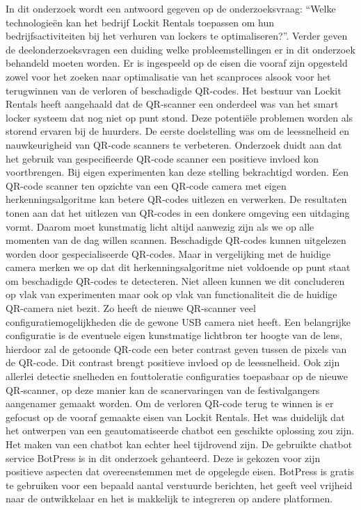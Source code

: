 In dit onderzoek wordt een antwoord gegeven op de onderzoeksvraag: “Welke technologieën kan het bedrijf Lockit Rentals toepassen om hun bedrijfsactiviteiten bij het verhuren van lockers te optimaliseren?”. Verder geven de deelonderzoeksvragen een duiding welke probleemstellingen er in dit onderzoek behandeld moeten worden. Er is ingespeeld op de eisen die vooraf zijn opgesteld zowel voor het zoeken naar optimalisatie van het scanproces alsook voor het terugwinnen van de verloren of beschadigde QR-codes. \newline
Het bestuur van Lockit Rentals heeft aangehaald dat de QR-scanner een onderdeel was van het smart locker systeem dat nog niet op punt stond. Deze potentiële problemen worden als storend ervaren bij de huurders. De eerste doelstelling was om de leessnelheid en nauwkeurigheid van QR-code scanners te verbeteren. Onderzoek duidt aan dat het gebruik van gespecifieerde QR-code scanner een positieve invloed kon voortbrengen. Bij eigen experimenten kan deze stelling bekrachtigd worden. Een QR-code scanner ten opzichte van een QR-code camera met eigen herkenningsalgoritme kan betere QR-codes  uitlezen en verwerken. De resultaten tonen aan dat het uitlezen van QR-codes in een donkere omgeving een uitdaging vormt. Daarom moet kunstmatig licht altijd aanwezig zijn als we op alle momenten van de dag willen scannen. Beschadigde QR-codes kunnen uitgelezen worden door gespecialiseerde QR-codes. Maar in vergelijking met de huidige camera merken we op dat dit herkenningsalgoritme niet voldoende op punt staat om beschadigde QR-codes te detecteren.\newline
Niet alleen kunnen we dit concluderen op vlak van experimenten maar ook op vlak van functionaliteit die de huidige QR-camera niet bezit. Zo heeft de nieuwe QR-scanner veel configuratiemogelijkheden die de gewone USB camera niet heeft. Een belangrijke configuratie is de eventuele eigen kunstmatige lichtbron ter hoogte van de lens, hierdoor zal de getoonde QR-code een beter contrast geven tussen de pixels van de QR-code. Dit contrast brengt positieve invloed op de leessnelheid. Ook zijn allerlei detectie snelheden en fouttoleratie configuraties toepasbaar op de nieuwe QR-scanner, op deze manier kan de scanervaringen van de festivalgangers aangenamer gemaakt worden.
\newline
Om de verloren QR-code terug te winnen is er gefocust op de vooraf gemaakte eisen van Lockit Rentals. Het was duidelijk dat het ontwerpen van een geautomatiseerde chatbot een geschikte oplossing zou zijn. Het maken van een chatbot kan echter heel tijdrovend zijn. De gebruikte chatbot service BotPress is in dit onderzoek gehanteerd. Deze is gekozen voor zijn positieve aspecten dat overeenstemmen met de opgelegde eisen. BotPress is gratis te gebruiken voor een bepaald aantal verstuurde berichten, het geeft veel vrijheid naar de ontwikkelaar en het is makkelijk te integreren op andere platformen.\newline
